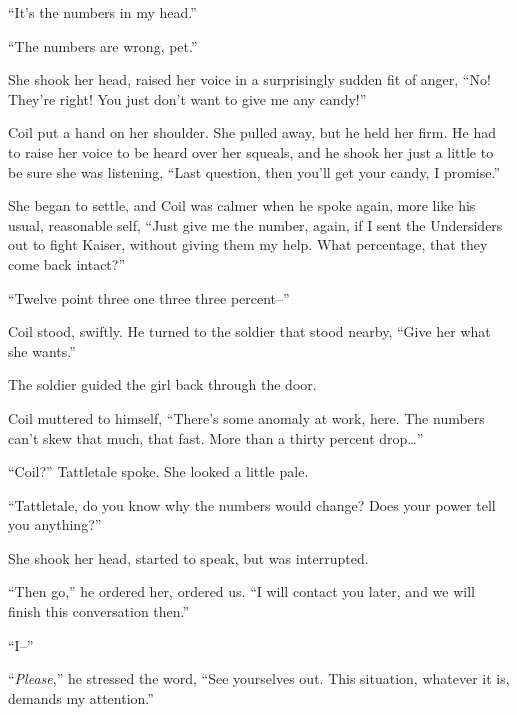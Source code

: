 ``It's the numbers in my head.''



``The numbers are wrong, pet.''



She shook her head, raised her voice in a surprisingly sudden fit of anger, ``No!  They're right!  You just don't want to give me any candy!''



Coil put a hand on her shoulder.  She pulled away, but he held her firm.  He had to raise her voice to be heard over her squeals, and he shook her just a little to be sure she was listening, ``Last question, then you'll get your candy, I promise.''



She began to settle, and Coil was calmer when he spoke again, more like his usual, reasonable self, ``Just give me the number, again, if I sent the Undersiders out to fight Kaiser, without giving them my help.  What percentage, that they come back intact?''



``Twelve point three one three three percent--''



Coil stood, swiftly.  He turned to the soldier that stood nearby, ``Give her what she wants.''



The soldier guided the girl back through the door.



Coil muttered to himself, ``There's some anomaly at work, here.  The numbers can't skew that much, that fast.  More than a thirty percent drop\ldots''



``Coil?'' Tattletale spoke.  She looked a little pale.



``Tattletale, do you know why the numbers would change?  Does your power tell you anything?''



She shook her head, started to speak, but was interrupted.



``Then go,'' he ordered her, ordered us.  ``I will contact you later, and we will finish this conversation then.''



``I--''



``\emph{Please},'' he stressed the word, ``See yourselves out.  This situation, whatever it is, demands my attention.''



